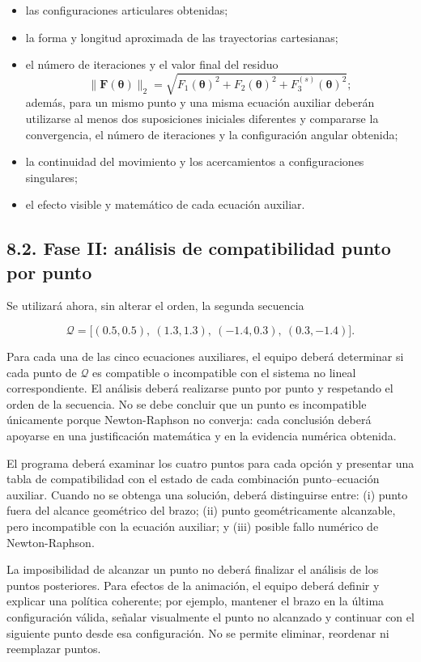 \documentclass[12pt]{article}
\begin{document}
\begin{itemize}
    \item las configuraciones articulares obtenidas;
    \item la forma y longitud aproximada de las trayectorias cartesianas;
    \item el número de iteraciones y el valor final del residuo
    \[
    \|\mathbf{F}(\boldsymbol{\theta})\|_2
    =\sqrt{F_1(\boldsymbol{\theta})^2+F_2(\boldsymbol{\theta})^2+F_3^{(s)}(\boldsymbol{\theta})^2};
    \]
    además, para un mismo punto y una misma ecuación auxiliar deberán utilizarse al menos dos suposiciones iniciales diferentes y compararse la convergencia, el número de iteraciones y la configuración angular obtenida;
    \item la continuidad del movimiento y los acercamientos a configuraciones singulares;
    \item el efecto visible y matemático de cada ecuación auxiliar.
\end{itemize}

\subsection*{8.2. Fase II: análisis de compatibilidad punto por punto}

Se utilizará ahora, sin alterar el orden, la segunda secuencia

\[
\mathcal{Q}=\bigl[(0.5,0.5),\ (1.3,1.3),\ (-1.4,0.3),\ (0.3,-1.4)\bigr].
\]

Para cada una de las cinco ecuaciones auxiliares, el equipo deberá determinar si cada punto de \(\mathcal{Q}\) es compatible o incompatible con el sistema no lineal correspondiente. El análisis deberá realizarse punto por punto y respetando el orden de la secuencia. No se debe concluir que un punto es incompatible únicamente porque Newton-Raphson no converja: cada conclusión deberá apoyarse en una justificación matemática y en la evidencia numérica obtenida.

El programa deberá examinar los cuatro puntos para cada opción y presentar una tabla de compatibilidad con el estado de cada combinación punto--ecuación auxiliar. Cuando no se obtenga una solución, deberá distinguirse entre: (i) punto fuera del alcance geométrico del brazo; (ii) punto geométricamente alcanzable, pero incompatible con la ecuación auxiliar; y (iii) posible fallo numérico de Newton-Raphson.

La imposibilidad de alcanzar un punto no deberá finalizar el análisis de los puntos posteriores. Para efectos de la animación, el equipo deberá definir y explicar una política coherente; por ejemplo, mantener el brazo en la última configuración válida, señalar visualmente el punto no alcanzado y continuar con el siguiente punto desde esa configuración. No se permite eliminar, reordenar ni reemplazar puntos.
\end{document}
